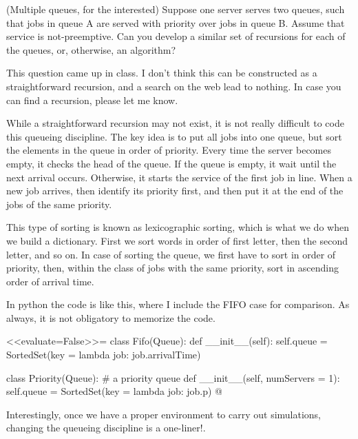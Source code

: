 \begin{question}(Multiple queues, for the interested) Suppose one server serves two
  queues, such that jobs in queue A are served with priority over jobs
  in queue B. Assume that service is not-preemptive.  Can you develop
  a similar set of recursions for each of the queues, or, otherwise,
  an algorithm?
  \begin{solution}
    This question came up in class. I don't think this can be
    constructed as a straightforward recursion, and a search on the
    web lead to nothing. In case you can find a recursion, please let
    me know.  

    While a straightforward recursion may not exist, it is not really
    difficult to code this queueing discipline. The key idea is to put
    all jobs into one queue, but sort the elements in the queue in
    order of priority. Every time the server becomes empty, it checks
    the head of the queue. If the queue is empty, it wait until the
    next arrival occurs. Otherwise, it starts the service of the first
    job in line. When a new job arrives, then identify its priority
    first, and then put it at the end of the jobs of the same
    priority.

    This type of sorting is known as lexicographic sorting, which is
    what we do when we build a dictionary. First we sort words in
    order of first letter, then the second letter, and so on. In case
    of sorting the queue, we first have to sort in order of priority,
    then, within the class of jobs with the same priority, sort in
    ascending order of arrival time.

    In python the code is like this, where I include the FIFO case for
    comparison. As always, it is not obligatory to memorize the  code.

<<evaluate=False>>=
class Fifo(Queue):
    def __init__(self):
        self.queue = SortedSet(key = lambda job: job.arrivalTime)

class Priority(Queue): # a priority queue
    def __init__(self, numServers = 1):
        self.queue = SortedSet(key = lambda job: job.p)
@

Interestingly, once we have a proper environment to carry out
simulations, changing the queueing discipline is a one-liner!.

  \end{solution}
\end{question}


